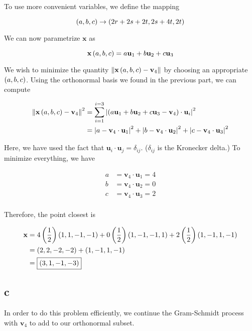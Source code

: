 \documentclass{article}
\begin{document}
To use more convenient variables, we define the mapping

$$
\left ( a, b, c \right) \to \left ( 2r+2s+2t, 2s + 4t, 2t \right)
$$

We can now parametrize $\bm{x}$ as

$$
\textbf{x} \left ( a, b, c \right) = a \textbf{u}_1 + b \textbf{u}_2 + c \textbf{u}_3
$$

We wish to minimize the quantity $\left\lVert\textbf{x} \left ( a, b, c \right) - \textbf{v}_4\right\rVert$ by choosing an appropriate $\left ( a, b, c \right)$.
Using the orthonormal basis we found in the previous part, we can compute

\begin{align*}
  \left\lVert\textbf{x} \left ( a, b, c \right) - \textbf{v}_4\right\rVert^2 &= \sum \limits_{i=1}^{i=3} \left\lvert  \left ( a \textbf{u}_1 + b \textbf{u}_2 + c \textbf{u}_3 - \textbf{v}_4 \right) \cdot \textbf{u}_i \right\rvert^2 \\
                                            &= \left\lvert a - \textbf{v}_4 \cdot \textbf{u}_1 \right\rvert^2 + \left\lvert b - \textbf{v}_4 \cdot \textbf{u}_2 \right\rvert^2 + \left\lvert c - \textbf{v}_4 \cdot \textbf{u}_3 \right\rvert^2 \\
\end{align*}

Here, we have used the fact that $\bm{u}_i \cdot \bm{u}_j = \delta_{ij}$.
($\delta_{ij}$ is the Kronecker delta.)
To minimize everything, we have

\begin{align*}
  a &= \bm{v}_4 \cdot \bm{u}_1 = 4\\
  b &= \bm{v}_4 \cdot \bm{u}_2 = 0\\
  c &= \bm{v}_4 \cdot \bm{u}_3 = 2\\
\end{align*}

Therefore, the point closest is

\begin{align*}
  \textbf{x} &= 4 \left ( \frac{1}{2} \right) \left ( 1, 1, -1, -1 \right) + 0 \left ( \frac{1}{2} \right) \left ( 1, -1, -1, 1 \right) + 2 \left ( \frac{1}{2} \right) \left ( 1, -1, 1, -1 \right)  \\
         &= \left ( 2, 2, -2, -2 \right) + \left ( 1, -1, 1, -1 \right) \\
         &= \boxed{\left ( 3, 1, -1, -3 \right)} \\
\end{align*}


\subsection*{c}

In order to do this problem efficiently, we continue the Gram-Schmidt process with $\bm{v}_4$ to add to our orthonormal subset.
\end{document}
